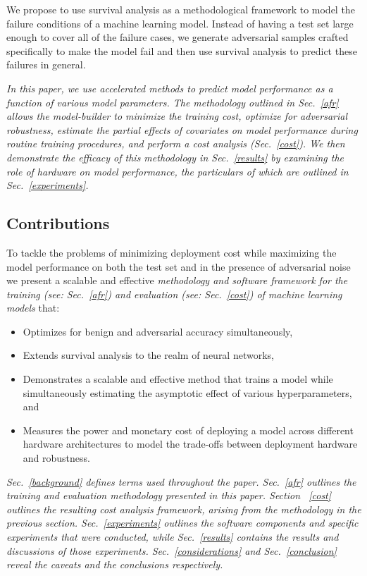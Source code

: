 \documentclass[conference]{IEEEtran}
\newcommand{\cm}[1]{\textit{{\color{blue}#1}}}
\begin{document}
We propose to use survival analysis as a methodological framework to model the failure conditions of a machine learning model. Instead of having a test set large enough to cover all of the failure cases, we generate adversarial samples crafted specifically to make the model fail and then use survival analysis to predict these failures in general.

\cm{In this paper, we use accelerated methods to predict model performance as a function of various model parameters. The methodology outlined in Sec.~\ref{afr} allows the model-builder to minimize the training cost, optimize for adversarial robustness, estimate the partial effects of covariates on model performance during routine training procedures, and perform a cost analysis (Sec.~\ref{cost}). We then demonstrate the efficacy of this methodology in Sec.~\ref{results} by examining the role of hardware on model performance, the particulars of which are outlined in Sec.~\ref{experiments}.}


\subsection{Contributions}
To tackle the problems of minimizing deployment cost while maximizing the model performance on both the test set and in the presence of adversarial noise we present a scalable and effective \cm{methodology and software framework for the training (see: Sec.~\ref{afr}) and evaluation (see: Sec.~\ref{cost}) of machine learning models} that:
\begin{itemize}
    \item Optimizes for benign and adversarial accuracy simultaneously,
    \item Extends survival analysis to the realm of neural networks, 
    \item Demonstrates a scalable and effective method that trains a model while simultaneously estimating the asymptotic effect of various hyperparameters, and
    \item Measures the power and monetary cost of deploying a model across different hardware architectures to model the trade-offs between deployment hardware and robustness.   
\end{itemize}

\cm{Sec.~\ref{background} defines terms used throughout the paper. Sec.~\ref{afr} outlines the training and evaluation methodology presented in this paper.  Section ~\ref{cost} outlines the resulting cost analysis framework, arising from the methodology in the previous section. Sec.~\ref{experiments} outlines the software components and specific experiments that were conducted, while Sec.~\ref{results} contains the results and discussions of those experiments. Sec.~\ref{considerations} and Sec.~\ref{conclusion} reveal the caveats and the conclusions respectively.}
\end{document}
